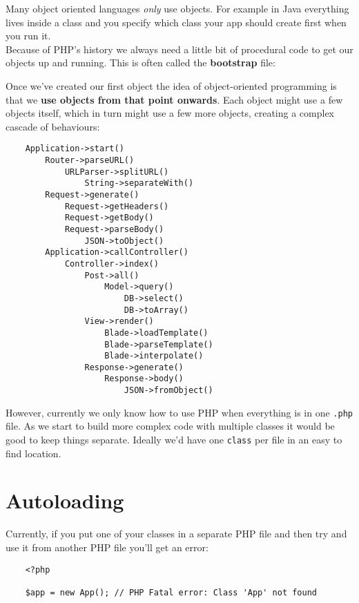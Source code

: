 Many object oriented languages \textit{only} use objects. For example in Java everything lives inside a class and you specify which class your app should create first when you run it.
\\

Because of PHP's history we always need a little bit of procedural code to get our objects up and running. This is often called the \textbf{bootstrap} file:


Once we've created our first object the idea of object-oriented programming is that we \textbf{use objects from that point onwards}. Each object might use a few objects itself, which in turn might use a few more objects, creating a complex cascade of behaviours:

\begin{verbatim}
    Application->start()
        Router->parseURL()
            URLParser->splitURL()
                String->separateWith()
        Request->generate()
            Request->getHeaders()
            Request->getBody()
            Request->parseBody()
                JSON->toObject()
        Application->callController()
            Controller->index()
                Post->all()
                    Model->query()
                        DB->select()
                        DB->toArray()
                View->render()
                    Blade->loadTemplate()
                    Blade->parseTemplate()
                    Blade->interpolate()
                Response->generate()
                    Response->body()
                        JSON->fromObject()
\end{verbatim}

However, currently we only know how to use PHP when everything is in one \texttt{.php} file. As we start to build more complex code with multiple classes it would be good to keep things separate. Ideally we'd have one \texttt{class} per file in an easy to find location.


\section{Autoloading}

Currently, if you put one of your classes in a separate PHP file and then try and use it from another PHP file you'll get an error:

\begin{verbatim}
    <?php

    $app = new App(); // PHP Fatal error: Class 'App' not found
\end{verbatim}

